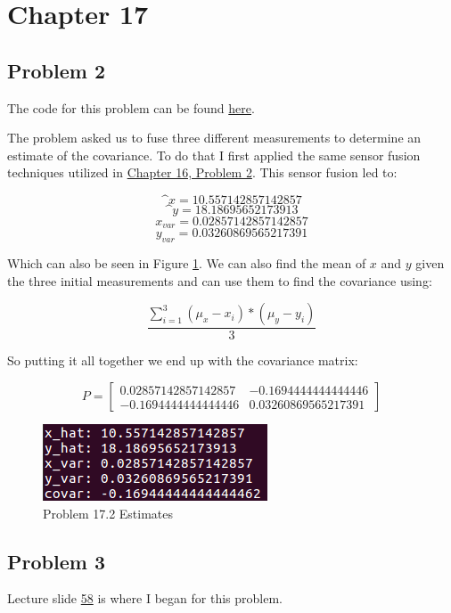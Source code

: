 \documentclass{article}
\newcommand\ddfrac[2]{\frac{\displaystyle #1}{\displaystyle #2}}
\begin{document}
\newpage
\section{\textbf{Chapter 17}}
\subsection{Problem 2}
The code for this problem can be found 
\href{https://github.com/macattackftw/RoboticsHW/blob/master/HW5/problem17_2.py}{here}.

The problem asked us to fuse three different measurements to determine an 
estimate of the covariance. To do that I first applied the same sensor fusion 
techniques utilized in \hyperref[problem:16.2]{Chapter 16, Problem 2}. This 
sensor fusion led to:

$$\^{x} = 10.557142857142857$$
$$\^{y} = 18.18695652173913$$
$$x_{var} = 0.02857142857142857$$
$$y_{var} = 0.03260869565217391$$

Which can also be seen in Figure \ref{fig:p17_2}. We can also find the mean of 
$x$ and $y$ given the three initial measurements and can use them to find the 
covariance using:

$$\ddfrac{\sum_{i=1}^{3} (\mu_x - x_i) * (\mu_y - y_i)}{3}$$

So putting it all together we end up with the covariance matrix:

\[
P =
  \begin{bmatrix}
    0.02857142857142857 & -0.1694444444444446 \\
    -0.1694444444444446 & 0.03260869565217391
  \end{bmatrix}
\]

\begin{figure}[h]
    \centering
    \includegraphics[scale=2.5]{problem17_2_data}
    \caption{Problem 17.2 Estimates}
    \label{fig:p17_2}
\end{figure}


\newpage
\subsection{Problem 3}
Lecture slide \href{https://d2l.sdbor.edu/content/enforced/2018FA/1139913-CENG-CSC-415-515-M001-2018FAIntroductiontoRobot/Robotics_Kalman.pdf}{58} is where I began for this problem. 
\end{document}
